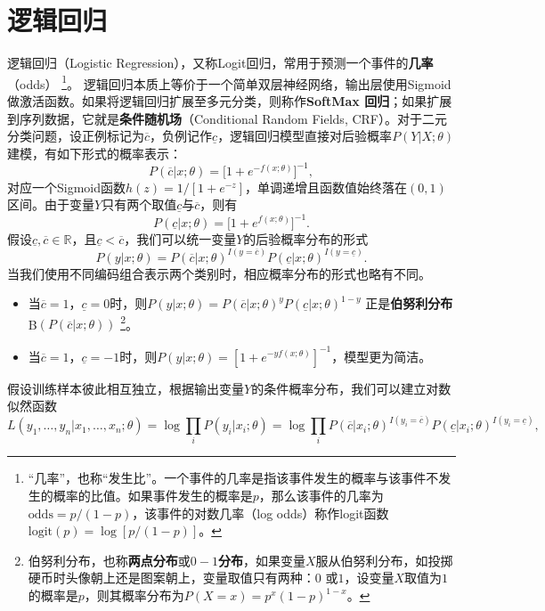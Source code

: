 \section{逻辑回归}
逻辑回归（Logistic Regression），又称Logit回归，常用于预测一个事件的\textbf{几率}（odds）
\footnote{“几率”，也称“发生比”。一个事件的几率是指该事件发生的概率与该事件不发生的概率的比值。如果事件发生的概率是$p$，那么该事件的几率为
$\mathrm{odds}=p/(1-p)$，该事件的对数几率（log odds）称作logit函数$\mathrm{logit}(p) = \log [p/(1-p)]$。}。
逻辑回归本质上等价于一个简单双层神经网络，输出层使用Sigmoid做激活函数。如果将逻辑回归扩展至多元分类，则称作\textbf{SoftMax 回归}；如果扩展到序列数据，它就是\textbf{条件随机场}（Conditional Random Fields, CRF）。对于二元分类问题，设正例标记为$\overline c$，负例记作$\underline c$，逻辑回归模型直接对后验概率$P(Y|X;\theta)$建模，有如下形式的概率表示：
\begin{equation}
    P(\overline c|x;\theta) = \big[1+e^{-f(x;\theta)}\big]^{-1},
\end{equation}
对应一个Sigmoid函数$h(z) = 1/[1+e^{-z}]$，单调递增且函数值始终落在$(0,1)$区间。由于变量$Y$只有两个取值$\underline c$与$\overline c$，则有
\begin{equation}
    P(\underline c|x;\theta) = \big[1+e^{f(x;\theta)}\big]^{-1}.
\end{equation}
假设$\underline c,\overline c\in \mathbb R$，且$\underline c<\overline c$，我们可以统一变量$Y$的后验概率分布的形式
\begin{equation}
    P(y|x;\theta) = P(\overline c|x;\theta)^{I(y=\overline c)}P(\underline c|x;\theta)^{I(y=\underline c)}.
\end{equation}
当我们使用不同编码组合表示两个类别时，相应概率分布的形式也略有不同。
\begin{itemize}
  \item 当$\overline c=1$，$\underline c=0$时，则$P(y|x;\theta) = P(\overline c|x;\theta)^y P(\underline c|x;\theta)^{1-y}$ 正是\textbf{伯努利分布}B$(P(\overline c|x;\theta))$
  \footnote{伯努利分布，也称\textbf{两点分布}或\textbf{$0-1$分布}，如果变量$X$服从伯努利分布，如投掷硬币时头像朝上还是图案朝上，变量取值只有两种：$0$ 或$1$，设变量$X$取值为$1$的概率是$p$，则其概率分布为$P(X=x)=p^x(1-p)^{1-x}$。}。
  \item 当$\overline c=1$，$\underline c=-1$时，则$P(y|x;\theta) = [1+e^{-yf(x;\theta)}]^{-1}$，模型更为简洁。
\end{itemize}
假设训练样本彼此相互独立，根据输出变量$Y$的条件概率分布，我们可以建立对数似然函数
\begin{equation}
    L(y_1,\ldots,y_n|x_1,\ldots,x_n;\theta) = \log \prod\limits_i P(y_i|x_i;\theta) = \log \prod\limits_i P(\overline c|x_i;\theta)^{I(y_i=\overline c)}P(\underline c|x_i;\theta)^{I(y_i=\underline c)},
\end{equation}
